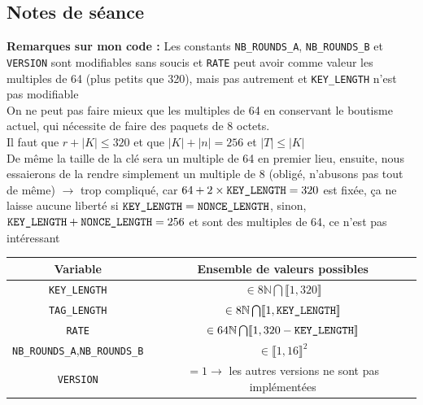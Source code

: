 \documentclass[12pt]{article}
\begin{document}
	\subsection{Notes de séance}
	\noindent \textbf{Remarques sur mon code :} Les constants \verb|NB_ROUNDS_A|, \verb|NB_ROUNDS_B| et \verb|VERSION| sont modifiables sans soucis et \verb|RATE| peut avoir comme valeur les multiples de 64 (plus petits que 320), mais pas autrement et \verb|KEY_LENGTH| n'est pas modifiable\\
	On ne peut pas faire mieux que les multiples de 64 en conservant le boutisme actuel, qui nécessite de faire des paquets de 8 octets.\\
	\warning Il faut que $r+|K|\leq320$ et que $|K| + |n| = 256$ et $|T| \leq |K|$\\
	De même la taille de la clé sera un multiple de 64 en premier lieu, ensuite, nous essaierons de la rendre simplement un multiple de 8 (obligé, n'abusons pas tout de même) $\rightarrow$ trop compliqué, car $64+2\times\verb|KEY_LENGTH| = 320$ est fixée, ça ne laisse aucune liberté si $\verb|KEY_LENGTH|=\verb|NONCE_LENGTH|$, sinon, $\verb|KEY_LENGTH|+\verb|NONCE_LENGTH|=256$ et sont des multiples de 64, ce n'est pas intéressant
	
	\begin{center}
		\begin{tabular}{|c|c|}
			\hline
			\textbf{Variable} & \textbf{Ensemble de valeurs possibles}\\
			\hline
			\verb|KEY_LENGTH| & $\in 8\mathbb{N} \bigcap \llbracket 1,320 \rrbracket$\\
			\hline
			\verb|TAG_LENGTH| & $\in 8\mathbb{N} \bigcap \llbracket 1,\verb|KEY_LENGTH| \rrbracket$\\
			\hline
			\verb|RATE| & $\in 64\mathbb{N} \bigcap \llbracket 1,320-\verb|KEY_LENGTH| \rrbracket$\\
			\hline
			\verb|NB_ROUNDS_A|,\verb|NB_ROUNDS_B| & $\in \llbracket 1,16 \rrbracket^2$\\
			\hline
			\verb|VERSION| & $=1 \rightarrow$ \footnotesize{les autres versions ne sont pas implémentées}\\
			\hline
		\end{tabular}
	\end{center}
	
\end{document}
